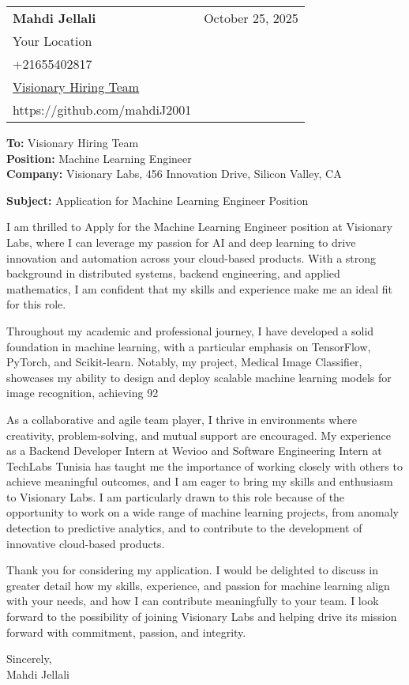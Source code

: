 \documentclass[letterpaper,11pt]{article}
\makeatletter
\newcommand{\letterHeading}[5]{
    \begin{tabular*}{\textwidth}{l@{\extracolsep{\fill}}r}
    \textbf{\Large #1} & #5 \\  %
    #2 & \\
    #3 & \\
    #4 & \\
    \end{tabular*}
    \vspace{15pt}
}
\newcommand{\letterRecipient}[3]{
    \textbf{\large To:} #1 \\
    \textbf{\large Position:} #2 \\
    \textbf{\large Company:} #3 \\
    \vspace{12pt}
}
\newcommand{\letterSubject}[1]{
    \textbf{\large Subject:} #1 \\
    \vspace{15pt}
}
\makeatother
\begin{document}
    \letterHeading
    {Mahdi Jellali}
    {Your Location}
    {+21655402817 \\ \href{mailto:Visionary Hiring Team}{Visionary Hiring Team}}
    {https://github.com/mahdiJ2001}
    {October 25, 2025}

    \letterRecipient
    {Visionary Hiring Team}
    {Machine Learning Engineer}
    {Visionary Labs, 456 Innovation Drive, Silicon Valley, CA}

    \letterSubject{Application for Machine Learning Engineer Position}

I am thrilled to Apply for the Machine Learning Engineer position at Visionary Labs, where I can leverage my passion for AI and deep learning to drive innovation and automation across your cloud-based products. With a strong background in distributed systems, backend engineering, and applied mathematics, I am confident that my skills and experience make me an ideal fit for this role.

    Throughout my academic and professional journey, I have developed a solid foundation in machine learning, with a particular emphasis on TensorFlow, PyTorch, and Scikit-learn. Notably, my project, Medical Image Classifier, showcases my ability to design and deploy scalable machine learning models for image recognition, achieving 92%

    As a collaborative and agile team player, I thrive in environments where creativity, problem-solving, and mutual support are encouraged. My experience as a Backend Developer Intern at Wevioo and Software Engineering Intern at TechLabs Tunisia has taught me the importance of working closely with others to achieve meaningful outcomes, and I am eager to bring my skills and enthusiasm to Visionary Labs. I am particularly drawn to this role because of the opportunity to work on a wide range of machine learning projects, from anomaly detection to predictive analytics, and to contribute to the development of innovative cloud-based products.

    Thank you for considering my application. I would be delighted to discuss in greater detail how my skills, experience, and passion for machine learning align with your needs, and how I can contribute meaningfully to your team. I look forward to the possibility of joining Visionary Labs and helping drive its mission forward with commitment, passion, and integrity.

    Sincerely,\\[12pt]

    Mahdi Jellali
\end{document}
